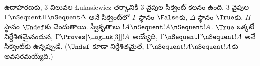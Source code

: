 \documentclass[../../../include/open-logic-section]{subfiles}
\begin{document}
ఉదాహరణకు, $3$-విలువల \L ukasiewicz
తర్కానికి $3$-వైపుల సీక్వెంట్ కలనం
ఉంది. $3$-వైపుల $\Gamma \nSequent \Pi \nSequent
\Delta$ అనే సీక్వెంట్‌లో $\Gamma$ స్థానం
$\False$కు, $\Delta$ స్థానం $\True$కు,
$\Pi$ స్థానం $\Undef$కు చెందుతాయి.
స్వీకృతాలు $!A \nSequent !A \nSequent !A$.
$\True$ ఒక్కటే నిర్దేశితమైనందున,
$\Gamma \Proves[\LogLuk[3]] !A$ అయ్యేది,
$\Gamma \nSequent \Gamma \nSequent !A$
అనే సీక్వెంట్‌కు
 ఉన్నప్పుడే. ($\Undef$ కూడా
నిర్దేశితమైతే, $\Gamma \nSequent !A
\nSequent !A$కు
అవసరమయ్యేది.)
\end{document}
